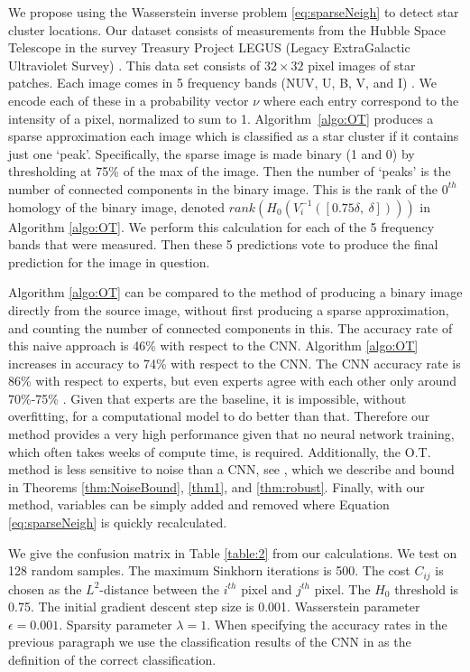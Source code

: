 \documentclass[conference]{IEEEtran}
\begin{document}
We propose using the Wasserstein inverse problem \eqref{eq:sparseNeigh} to detect star cluster locations. 
Our dataset consists of measurements from the Hubble Space Telescope in the survey Treasury Project LEGUS (Legacy ExtraGalactic Ultraviolet Survey) \cite{calzetti}. This data set consists of $32\times 32$ pixel images of star patches. Each image comes in 5 frequency bands (NUV, U, B, V, and I) \cite{calzetti}. We encode each of these in a probability vector $\nu$ where each entry correspond to the intensity of a pixel, normalized to sum to 1. Algorithm~\ref{algo:OT} produces a sparse approximation each image which is classified as a star cluster if it contains just one `peak'. Specifically, the sparse image is made binary (1 and 0) by thresholding at 75\% of the max of the image. Then the number of `peaks' is the number of connected components in the binary image. This is the rank of the $0^{th}$ homology of the binary image, denoted $rank(H_0(V_i^{-1}([0.75 \delta,\ \delta])))$ in Algorithm \ref{algo:OT}. We perform this calculation for each of the 5 frequency bands that were measured. 
Then these 5 predictions vote to produce the final prediction for the image in question. 

Algorithm \ref{algo:OT} can be compared to the method of producing a binary image directly from the source image, without first producing a sparse approximation, and counting the number of connected components in this. The accuracy rate of this naive approach is 46\% with respect to the CNN. Algorithm \ref{algo:OT} increases in accuracy to 74\% with respect to the CNN. The CNN accuracy rate is 86\% with respect to experts, but even experts agree with each other only around 70\%-75\% \cite{adamo, grasha, wei}. Given that experts are the baseline, it is impossible, without overfitting, for a computational model to do better than that. Therefore our method provides a very high performance given that no neural network training, which often takes weeks of compute time, is required. Additionally, the O.T. method is less sensitive to noise than a CNN, see \cite{zou}, which we describe and bound in Theorems \ref{thm:NoiseBound}, \ref{thm1}, and \ref{thm:robust}. Finally, with our method, variables can be simply added and removed where Equation \eqref{eq:sparseNeigh} is quickly recalculated. 

We give the confusion matrix in Table \ref{table:2} from our calculations. We test on 128 random samples. The maximum Sinkhorn iterations is 500. The cost $C_{ij}$ is chosen as the $L^2$-distance between the $i^{th}$ pixel and $j^{th}$ pixel. The $H_0$ threshold is 0.75. The initial gradient descent step size is 0.001. Wasserstein parameter $\epsilon=0.001$. Sparsity parameter $\lambda=1$. When specifying the accuracy rates in the previous paragraph we use the classification results of the CNN in \cite{perez} as the definition of the correct classification. 
\end{document}
